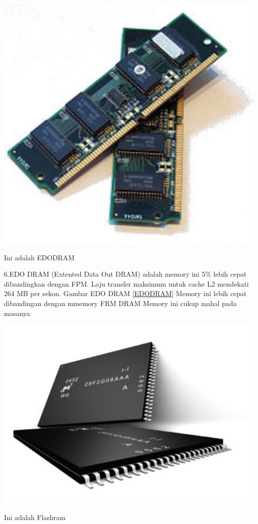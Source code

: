   \begin{figures}[ht]
  \centerline{\includegraphics[width=1\textwidth]{figures/EDODRAM.jpg}}
  \caption{Ini adalah EDODRAM}
  \label{EDODRAM}
  \end{figures}

6.EDO DRAM (Extented Data Out DRAM) adalah memory ini 5\% lebih cepat dibandingkan dengan FPM. Laju transfer maksimum untuk cache L2 mendekati 264 MB per sekon.
Gambar EDO DRAM \ref{EDODRAM}
    \-Memory ini lebih cepat dibandingan dengan mmemory FRM DRAM
    \-Memory ini cukup mahal pada masanya


  \begin{figures}[ht]
  \centerline{\includegraphics[width=1\textwidth]{figures/Flashram.jpg}}
  \caption{Ini adalah Flashram}
  \label{Flashram}
  \end{figures}

